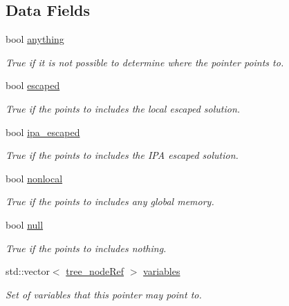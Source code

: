 \subsection*{Data Fields}
\begin{DoxyCompactItemize}
\item 
bool \hyperlink{structPointToSolution_a15fcaeedd444097570de463deb616ec4}{anything}
\begin{DoxyCompactList}\small\item\em True if it is not possible to determine where the pointer points to. \end{DoxyCompactList}\item 
bool \hyperlink{structPointToSolution_a95a7e7a47d0add8f5adb4d66e23d9d31}{escaped}
\begin{DoxyCompactList}\small\item\em True if the points to includes the local escaped solution. \end{DoxyCompactList}\item 
bool \hyperlink{structPointToSolution_a084aba38b17b29c3459a60a3e4c49036}{ipa\+\_\+escaped}
\begin{DoxyCompactList}\small\item\em True if the points to includes the I\+PA escaped solution. \end{DoxyCompactList}\item 
bool \hyperlink{structPointToSolution_a7225c28817c1a33923b92b4de4e814ed}{nonlocal}
\begin{DoxyCompactList}\small\item\em True if the points to includes any global memory. \end{DoxyCompactList}\item 
bool \hyperlink{structPointToSolution_abedd916fbd8ebd406bf80ff4bbcef7eb}{null}
\begin{DoxyCompactList}\small\item\em True if the points to includes nothing. \end{DoxyCompactList}\item 
std\+::vector$<$ \hyperlink{tree__node_8hpp_a6ee377554d1c4871ad66a337eaa67fd5}{tree\+\_\+node\+Ref} $>$ \hyperlink{structPointToSolution_af6e932495118956b3caabcfdd62fe1c2}{variables}
\begin{DoxyCompactList}\small\item\em Set of variables that this pointer may point to. \end{DoxyCompactList}\end{DoxyCompactItemize}


